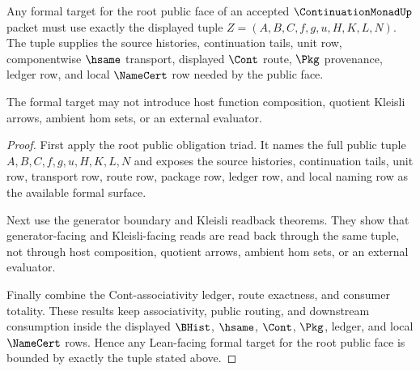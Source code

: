\begin{theorem}
\label{thm:continuation-monad-root-public-formal-target-boundary}
Any formal target for the root public face of an accepted
$\ContinuationMonadUp$ packet must use exactly the displayed tuple
$Z=(A,B,C,f,g,u,H,K,L,N)$. The tuple supplies the source histories,
continuation tails, unit row, componentwise $\hsame$ transport, displayed
$\Cont$ route, $\Pkg$ provenance, ledger row, and local $\NameCert$ row needed
by the public face.

The formal target may not introduce host function composition, quotient
Kleisli arrows, ambient hom sets, or an external evaluator.
\end{theorem}
\begin{proof}
First apply the root public obligation triad. It names the full public tuple
$A,B,C,f,g,u,H,K,L,N$ and exposes the source histories, continuation tails,
unit row, transport row, route row, package row, ledger row, and local naming
row as the available formal surface.

Next use the generator boundary and Kleisli readback theorems. They show that
generator-facing and Kleisli-facing reads are read back through the same tuple,
not through host composition, quotient arrows, ambient hom sets, or an
external evaluator.

Finally combine the Cont-associativity ledger, route exactness, and consumer
totality. These results keep associativity, public routing, and downstream
consumption inside the displayed $\BHist$, $\hsame$, $\Cont$, $\Pkg$, ledger,
and local $\NameCert$ rows. Hence any Lean-facing formal target for the root
public face is bounded by exactly the tuple stated above.
\end{proof}

